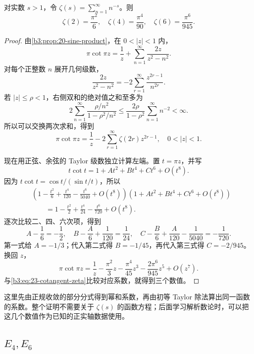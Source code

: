 \begin{proposition}[三个偶数幂和的值]\label{b3:prop:23-zeta-even-values}
对实数 \(s>1\)，令 \(\zeta(s)=\sum_{n=1}^{\infty}n^{-s}\)。则
\[
 \zeta(2)=\frac{\pi^2}{6},\quad
 \zeta(4)=\frac{\pi^4}{90},\quad
 \zeta(6)=\frac{\pi^6}{945}.
\]
\end{proposition}
\begin{proof}
由\cref{b3:prop:20-sine-product}，在 \(0<|z|<1\) 内，
\[
 \pi\cot\pi z
 =\frac1z+\sum_{n=1}^{\infty}\frac{2z}{z^2-n^2}.
\]
对每个正整数 \(n\) 展开几何级数，
\[
 \frac{2z}{z^2-n^2}
 =-2\sum_{r=1}^{\infty}\frac{z^{2r-1}}{n^{2r}}.
\]
若 \(|z|\le\rho<1\)，右侧双和的绝对值之和至多为
\[
 2\sum_{n=1}^{\infty}\frac{\rho/n^2}{1-\rho^2/n^2}
 \le\frac{2\rho}{1-\rho^2}\sum_{n=1}^{\infty}n^{-2}<\infty.
\]
所以可以交换两次求和，得到
\begin{equation}\label{b3:eq:23-cotangent-zeta}
 \pi\cot\pi z=\frac1z-2\sum_{r=1}^{\infty}\zeta(2r)z^{2r-1},
 \quad 0<|z|<1.
\end{equation}

现在用正弦、余弦的 Taylor 级数独立计算左端。置 \(t=\pi z\)，并写
\[
 t\cot t=1+At^2+Bt^4+Ct^6+O(t^8).
\]
因为 \(t\cot t=\cos t/(\sin t/t)\)，所以
\[
 \begin{aligned}
 &\left(1-\frac{t^2}{6}+\frac{t^4}{120}
              -\frac{t^6}{5040}+O(t^8)\right)
   \left(1+At^2+Bt^4+Ct^6+O(t^8)\right)\\
 &\hspace{2em}=1-\frac{t^2}{2}+\frac{t^4}{24}
                    -\frac{t^6}{720}+O(t^8).
 \end{aligned}
\]
逐次比较二、四、六次项，得到
\[
 A-\frac16=-\frac12,\quad
 B-\frac A6+\frac1{120}=\frac1{24},\quad
 C-\frac B6+\frac A{120}-\frac1{5040}=-\frac1{720}.
\]
第一式给 \(A=-1/3\)；代入第二式得 \(B=-1/45\)，再代入第三式得 \(C=-2/945\)。换回 \(z\)，
\[
 \pi\cot\pi z=\frac1z-\frac{\pi^2}{3}z
                    -\frac{\pi^4}{45}z^3
                    -\frac{2\pi^6}{945}z^5+O(z^7).
\]
与\eqref{b3:eq:23-cotangent-zeta}比较对应系数，就得到三个数值。
\end{proof}

这里先由正规收敛的部分分式得到幂和系数，再由初等 Taylor 除法算出同一函数的系数。整个证明不需要关于 \(\zeta(s)\) 的函数方程；后面学习解析数论时，可以把这几个数值作为已知的正实轴数据使用。

\subsection{\texorpdfstring{\(E_4,E_6\)}{E4,E6}}
\label{b3:subsec:230402}

